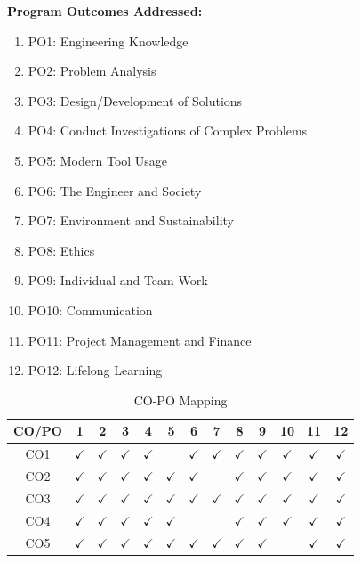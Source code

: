 \documentclass[12pt,a4paper,oneside]{report}
\begin{document}
\textbf{Program Outcomes Addressed:}
\begin{enumerate}[leftmargin=1.2cm]
  \item PO1: Engineering Knowledge
  \item PO2: Problem Analysis
  \item PO3: Design/Development of Solutions
  \item PO4: Conduct Investigations of Complex Problems
  \item PO5: Modern Tool Usage
  \item PO6: The Engineer and Society
  \item PO7: Environment and Sustainability
  \item PO8: Ethics
  \item PO9: Individual and Team Work
  \item PO10: Communication
  \item PO11: Project Management and Finance
  \item PO12: Lifelong Learning
\end{enumerate}

\begin{table}[H]
\centering
\caption{CO-PO Mapping}
{\fontsize{9}{11}\selectfont
\begin{tabular}{|c|*{12}{c|}}
\hline
\textbf{CO/PO} & \textbf{1} & \textbf{2} & \textbf{3} & \textbf{4} & \textbf{5} & \textbf{6} & \textbf{7} & \textbf{8} & \textbf{9} & \textbf{10} & \textbf{11} & \textbf{12} \\
\hline
CO1 & $\checkmark$ & $\checkmark$ & $\checkmark$ & $\checkmark$ & & $\checkmark$ & $\checkmark$ & $\checkmark$ & $\checkmark$ & $\checkmark$ & $\checkmark$ & $\checkmark$ \\
\hline
CO2 & $\checkmark$ & $\checkmark$ & $\checkmark$ & $\checkmark$ & $\checkmark$ & $\checkmark$ & & $\checkmark$ & $\checkmark$ & $\checkmark$ & $\checkmark$ & $\checkmark$ \\
\hline
CO3 & $\checkmark$ & $\checkmark$ & $\checkmark$ & $\checkmark$ & $\checkmark$ & $\checkmark$ & $\checkmark$ & $\checkmark$ & $\checkmark$ & $\checkmark$ & $\checkmark$ & $\checkmark$ \\
\hline
CO4 & $\checkmark$ & $\checkmark$ & $\checkmark$ & $\checkmark$ & $\checkmark$ & & & $\checkmark$ & $\checkmark$ & $\checkmark$ & $\checkmark$ & $\checkmark$ \\
\hline
CO5 & $\checkmark$ & $\checkmark$ & $\checkmark$ & $\checkmark$ & $\checkmark$ & $\checkmark$ & $\checkmark$ & $\checkmark$ & $\checkmark$ & & $\checkmark$ & $\checkmark$ \\
\hline
\end{tabular}}
\end{table}
\end{document}

